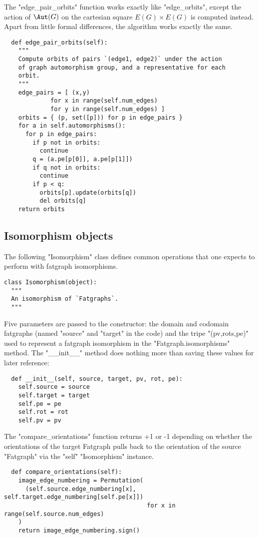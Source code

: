 The "edge_pair_orbits" function works exactly like "edge_orbits",
except the action of $\Aut(G)$ on the cartesian square $E(G) \times
E(G)$ is computed instead.  Apart from little formal differences, the
algorithm works exactly the same.
\begin{lstlisting}
  def edge_pair_orbits(self):
    """
    Compute orbits of pairs `(edge1, edge2)` under the action
    of graph automorphism group, and a representative for each
    orbit.
    """
    edge_pairs = [ (x,y) 
             for x in range(self.num_edges)
             for y in range(self.num_edges) ]
    orbits = { (p, set([p])) for p in edge_pairs }
    for a in self.automorphisms():
      for p in edge_pairs:
        if p not in orbits:
          continue
        q = (a.pe[p[0]], a.pe[p[1]])
        if q not in orbits:
          continue
        if p < q:
          orbits[p].update(orbits[q])
          del orbits[q]
    return orbits

\end{lstlisting}


\subsection{Isomorphism objects}
\label{sec:iso}

The following "Isomorphism" class defines common operations that one
expects to perform with fatgraph isomorphisms.
\begin{lstlisting}
class Isomorphism(object):
  """
  An isomorphism of `Fatgraphs`.
  """
\end{lstlisting}
Five parameters are passed to the constructor: the domain
and codomain fatgraphs (named "source" and "target" in the code) and
the tripe "(pv,rots,pe)" used to represent a fatgraph isomorphism in
the "Fatgraph.isomorphisms" method.  The "__init__" method does
nothing more than saving these values for later reference:
\begin{lstlisting}
  def __init__(self, source, target, pv, rot, pe):
    self.source = source
    self.target = target
    self.pe = pe
    self.rot = rot
    self.pv = pv

\end{lstlisting}

The "compare_orientations" function returns +1 or -1 depending on
whether the orientations of the target Fatgraph pulls back to the
orientation of the source "Fatgraph" via the "self" "Isomorphism"
instance.
\begin{lstlisting}
  def compare_orientations(self):
    image_edge_numbering = Permutation(
      (self.source.edge_numbering[x], self.target.edge_numbering[self.pe[x]])
                                        for x in range(self.source.num_edges)
    )
    return image_edge_numbering.sign()

\end{lstlisting}

